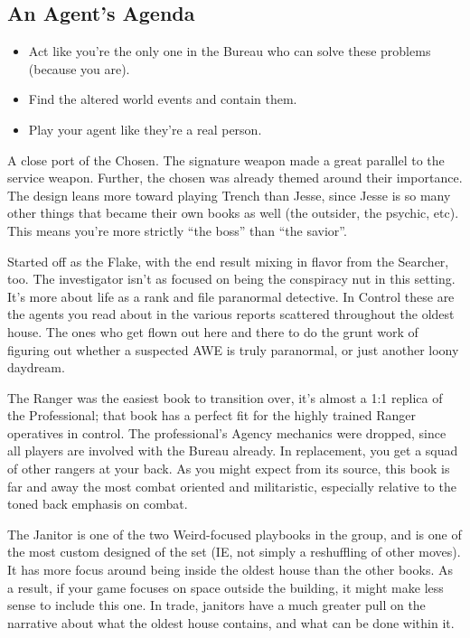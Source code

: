 \documentclass[12pt,oneside,landscape]{memoir}
\begin{document}
\begin{multicols}{3}

\begin{tcolorbox}[bottom=4mm,after skip=8mm]
\section*{An Agent's Agenda}
\begin{itemize}

\item Act like you’re the only one in the Bureau who can solve these problems (because you are).
\item Find the altered world events and contain them.
\item Play your agent like they’re a real person.

\end{itemize}
\end{tcolorbox}

{A close port of the Chosen.  The signature weapon made a great parallel to the service weapon.  Further, the chosen was already themed around their importance.  The design leans more toward playing Trench than Jesse, since Jesse is so many other things that became their own books as well (the outsider, the psychic, etc).  This means you’re more strictly “the boss” than “the savior”.}

{Started off as the Flake, with the end result mixing in flavor from the Searcher, too.  The investigator isn’t as focused on being the conspiracy nut in this setting.  It’s more about life as a rank and file paranormal detective.  In Control these are the agents you read about in the various reports scattered throughout the oldest house.  The ones who get flown out here and there to do the grunt work of figuring out whether a suspected AWE is truly paranormal, or just another loony daydream.}

{The Ranger was the easiest book to transition over, it’s almost a 1:1 replica of the Professional; that book has a perfect fit for the highly trained Ranger operatives in control.  The professional’s Agency mechanics were dropped, since all players are involved with the Bureau already.  In replacement, you get a squad of other rangers at your back.  As you might expect from its source, this book is far and away the most combat oriented and militaristic, especially relative to the toned back emphasis on combat.}

{The Janitor is one of the two Weird-focused playbooks in the group, and is one of the most custom designed of the set (IE, not simply a reshuffling of other moves).  It has more focus around being inside the oldest house than the other books.  As a result, if your game focuses on space outside the building, it might make less sense to include this one.  In trade, janitors have a much greater pull on the narrative about what the oldest house contains, and what can be done within it.}


\end{multicols}
\end{document}
